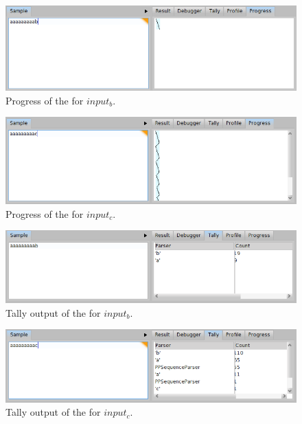 \documentclass[a4paper,10pt,twoside]{book}
\begin{document}
\begin{figure}
  \begin{center}
    \includegraphics[width=\linewidth]{example-progressAaab}
    \caption{Progress of the  for $input_b$. \label{fig:pp/example-progressAaab}}
  \end{center}
\end{figure}

\begin{figure}
  \begin{center}
    \includegraphics[width=\linewidth]{example-progressAaac}
    \caption{Progress of the  for $input_c$. \label{fig:pp/example-progressAaac}}
  \end{center}
\end{figure}

\begin{figure}
  \begin{center}
    \includegraphics[width=\linewidth]{example-tallyAaab}
    \caption{Tally output of the  for $input_b$. \label{fig:pp/example-tallyAaab}}
  \end{center}
\end{figure}

\begin{figure}
  \begin{center}
    \includegraphics[width=\linewidth]{example-tallyAaac}
    \caption{Tally output of the  for $input_c$. \label{fig:pp/example-tallyAaac}}
  \end{center}
\end{figure}
\end{document}
